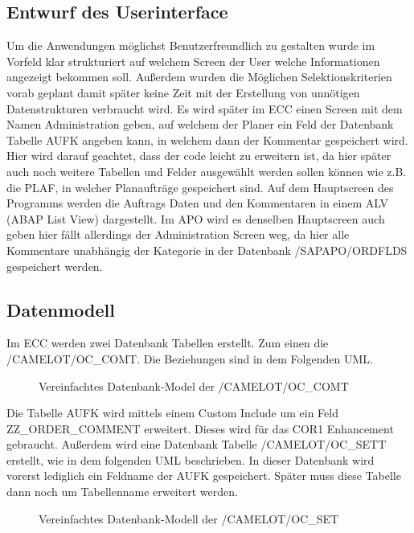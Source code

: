 \subsection{Entwurf des Userinterface}
\label{sec:Benutzeroberflaeche} 
Um die Anwendungen möglichst Benutzerfreundlich zu gestalten wurde im Vorfeld klar strukturiert auf welchem Screen der User welche Informationen angezeigt bekommen soll. Außerdem wurden die Möglichen Selektionskriterien vorab geplant damit später keine Zeit mit der Erstellung von unnötigen Datenstrukturen verbraucht wird. Es wird später im \ac{ECC} einen Screen mit dem Namen Administration geben, auf welchem der Planer ein Feld der Datenbank Tabelle AUFK angeben kann, in welchem dann der Kommentar gespeichert wird. Hier wird darauf geachtet, dass der code leicht zu erweitern ist, da hier später auch noch weitere Tabellen und Felder ausgewählt werden sollen können wie z.B. die PLAF, in welcher Planaufträge gespeichert sind. Auf dem Hauptscreen des Programms werden die Auftrags Daten und den Kommentaren in einem ALV (\ac{ABAP} List View) dargestellt. Im \ac{APO} wird es denselben Hauptscreen auch geben hier fällt allerdings der Administration Screen weg, da hier alle Kommentare unabhängig der Kategorie in der Datenbank /SAPAPO/ORDFLDS gespeichert werden. 

\subsection{Datenmodell}
\label{sec:Datenmodell}
Im ECC werden zwei Datenbank Tabellen erstellt. Zum einen die /CAMELOT/OC\_COMT. Die Beziehungen sind in dem Folgenden \ac{UML}.

\begin{figure}[htb]
\centering
{}
\caption{Vereinfachtes Datenbank-Model der /CAMELOT/OC\_COMT}
\label{fig:ECC01}
\end{figure} 

Die Tabelle AUFK wird mittels einem Custom Include um ein Feld ZZ\_ORDER\_COMMENT erweitert. Dieses wird für das COR1 Enhancement gebraucht. Außerdem wird eine Datenbank Tabelle /CAMELOT/OC\_SETT erstellt, wie in dem folgenden \ac{UML} beschrieben. In dieser Datenbank wird vorerst lediglich ein Feldname der AUFK gespeichert. Später muss diese Tabelle dann noch um Tabellenname erweitert werden.

\begin{figure}[htb]
	\centering
	\caption{Vereinfachtes Datenbank-Modell der /CAMELOT/OC\_SET}
	\label{fig:ECC02}
\end{figure} 

